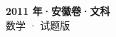\documentclass[zihao=-4, a4paper]{ctexart}
\begin{document}
\begin{center}
  {\Large\bfseries 2011 年·安徽卷·文科}\\[4pt]
  {\large 数学 · 试题版}
\end{center}
\medskip
{}

\end{document}
